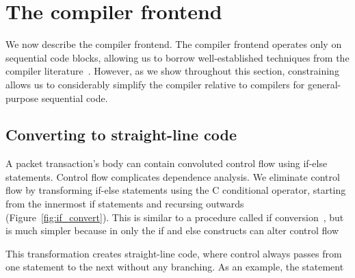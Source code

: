 \section{The \pktlanguage compiler frontend}

We now describe the \pktlanguage compiler frontend. The compiler frontend
operates only on sequential code blocks, allowing us to borrow well-established
techniques from the compiler literature~\cite{muchnik}. However, as we show
throughout this section, constraining \pktlanguage allows us to considerably
simplify the compiler relative to compilers for general-purpose sequential
code.

\subsection{Converting to straight-line code}
A packet transaction's body can contain convoluted control flow using if-else
statements. Control flow complicates dependence analysis. We eliminate control
flow by transforming if-else statements using the C conditional operator,
starting from the innermost if statements and recursing outwards
(Figure~\ref{fig:if_convert}). This is similar to a procedure called if
conversion~\cite{allen_if_conversion}, but is much simpler because in \pktlanguage
only the if and else constructs can alter control flow 


This
transformation creates straight-line code, where control always passes from one
statement to the next without any branching. As an example, the statement



\label{s:compiler}

